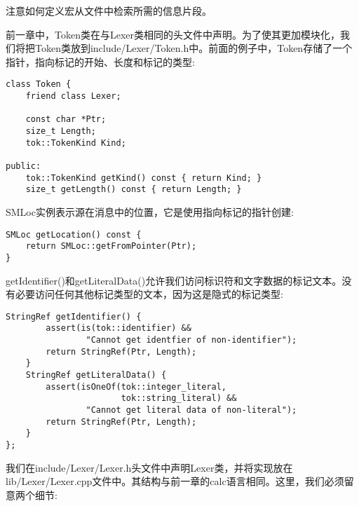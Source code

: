 \begin{tcolorbox}[colback=blue!5!white,colframe=blue!75!black,title=Tip]
注意如何定义宏从文件中检索所需的信息片段。
\end{tcolorbox}

前一章中，Token类在与Lexer类相同的头文件中声明。为了使其更加模块化，我们将把Token类放到include/Lexer/Token.h中。前面的例子中，Token存储了一个指针，指向标记的开始、长度和标记的类型:\par

\begin{lstlisting}[caption={}]
class Token {
	friend class Lexer;
	
	const char *Ptr;
	size_t Length;
	tok::TokenKind Kind;
	
public:
	tok::TokenKind getKind() const { return Kind; }
	size_t getLength() const { return Length; }
\end{lstlisting}

SMLoc实例表示源在消息中的位置，它是使用指向标记的指针创建:\par

\begin{lstlisting}[caption={}]
SMLoc getLocation() const {
	return SMLoc::getFromPointer(Ptr);
}
\end{lstlisting}

getIdentifier()和getLiteralData()允许我们访问标识符和文字数据的标记文本。没有必要访问任何其他标记类型的文本，因为这是隐式的标记类型:\par

\begin{lstlisting}[caption={}]
	StringRef getIdentifier() {
		assert(is(tok::identifier) &&
				"Cannot get identfier of non-identifier");
		return StringRef(Ptr, Length);
	}
	StringRef getLiteralData() {
		assert(isOneOf(tok::integer_literal,
					   tok::string_literal) &&
				"Cannot get literal data of non-literal");
		return StringRef(Ptr, Length);
	}
};
\end{lstlisting}

我们在include/Lexer/Lexer.h头文件中声明Lexer类，并将实现放在lib/Lexer/Lexer.cpp文件中。其结构与前一章的calc语言相同。这里，我们必须留意两个细节:\par

